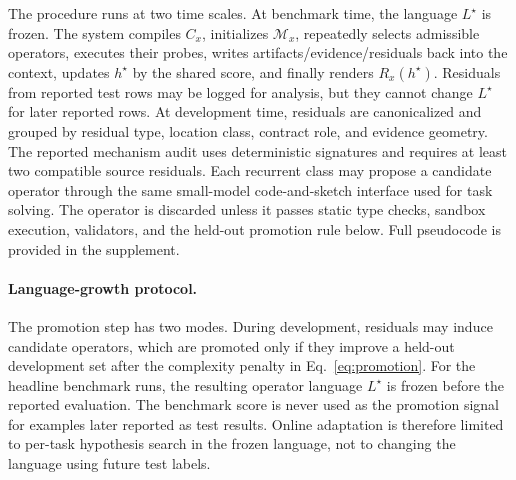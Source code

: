 \documentclass[letterpaper]{article}
\begin{document}
The procedure runs at two time scales. At benchmark time, the language
$L^\star$ is frozen. The system compiles $C_x$, initializes
$\mathcal{M}_x$, repeatedly selects admissible operators, executes their
probes, writes artifacts/evidence/residuals back into the context, updates
$h^\star$ by the shared score, and finally renders $R_x(h^\star)$. Residuals
from reported test rows may be logged for analysis, but they cannot change
$L^\star$ for later reported rows. At development time, residuals are
canonicalized and grouped by residual type, location class, contract role, and
evidence geometry. The reported mechanism audit uses deterministic signatures
and requires at least two compatible source residuals. Each recurrent class may
propose a candidate operator through the same small-model code-and-sketch
interface used for task solving. The operator is discarded unless it passes
static type checks, sandbox execution, validators, and the held-out promotion
rule below. Full pseudocode is provided in the supplement.

\paragraph{Language-growth protocol.}
The promotion step has two modes. During development, residuals may induce
candidate operators, which are promoted only if they improve a held-out
development set after the complexity penalty in Eq.~\eqref{eq:promotion}. For the headline
benchmark runs, the resulting operator language $L^\star$ is frozen before the
reported evaluation. The benchmark score is never used as the promotion signal
for examples later reported as test results. Online adaptation is therefore
limited to per-task hypothesis search in the frozen language, not to changing
the language using future test labels.
\end{document}
